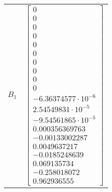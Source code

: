 \begin{tabular}{cl}
 $B_{1}$  & $\left[\begin{matrix}0\\0\\0\\0\\0\\0\\0\\0\\0\\0\\-6.36374577 \cdot 10^{-6}\\2.54549831 \cdot 10^{-5}\\-9.54561865 \cdot 10^{-5}\\0.000356369763\\-0.00133002287\\0.0049637217\\-0.0185248639\\0.069135734\\-0.258018072\\0.962936555\end{matrix}\right]$                                                                                                                                                                                                                                                                                                                                                                                                                                                                                                                                                                                                                                                                                                                                                                                                                                                                                                                                                                                                                                                                                                                                                                                                                                                                                                                                                                                                                                                                                                                                                                                                                                                                                                                                                                                                                                                                                                                                                                                                                                                                                                                                                                                                                                                                               
\end{tabular}
